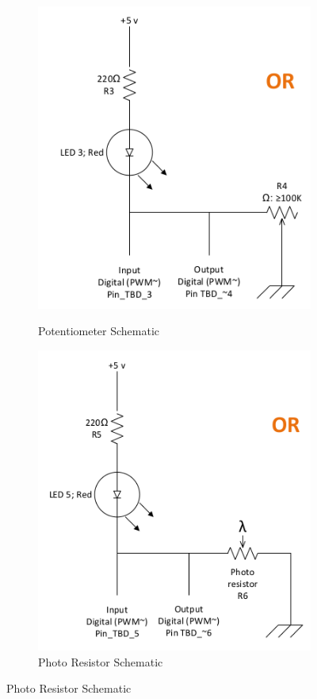 \documentclass[12pt,letterpaper,oneside]{article}
\begin{document}
		\begin{figure}[here]
	        \centering
	        \caption{Analog Sensor Example Schematics}\label{fig:schem2}
	        \begin{subfigure}[b]{0.4\textwidth}
	       	 	\caption{Potentiometer Schematic}
	            \includegraphics[width=\textwidth]{images/circuit_3.png}
                \label{fig:sens3}
	        \end{subfigure}%
	        \begin{subfigure}[b]{0.4\textwidth}
                \caption{Photo Resistor Schematic}
                \includegraphics[width=\textwidth]{images/circuit_4.png}

\end{subfigure}
\end{figure}
\end{document}
